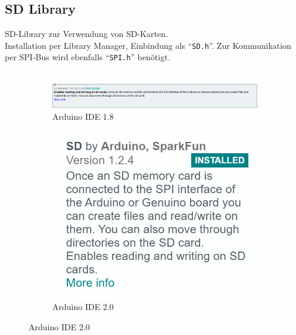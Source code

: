\documentclass[ngerman]{schoolPres}
\begin{document}
  \subsection{SD Library}%
  \begin{frame}
    SD-Library zur Verwendung von SD-Karten.\\
    Installation per Library Manager, Einbindung als \enquote{\texttt{SD.h}}.
    Zur Kommunikation per SPI-Bus wird ebenfalls \enquote{\texttt{SPI.h}} benötigt.\\~\\


    \begin{figure}[!ht]
      \centering%
      \begin{subfigure}{.72\linewidth}
        \includegraphics[width=\linewidth]{media/sd-lib.png}
        \caption{Arduino IDE 1.8}%
      \end{subfigure}\hspace{1.5em}%
      \begin{subfigure}{.2\linewidth}%
        \includegraphics[width=\linewidth]{media/sd-lib-ide2.png}
        \caption{Arduino IDE 2.0}
      \end{subfigure}
    \end{figure}
  \end{frame}
\end{document}
